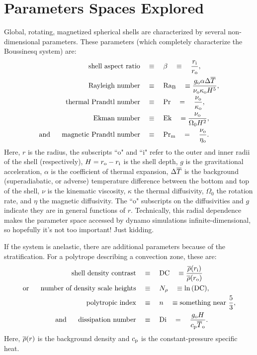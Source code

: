 \documentclass[12pt]{article} %
\begin{document}
\section{Parameters  Spaces Explored}
Global, rotating, magnetized spherical shells are characterized by several non-dimensional parameters. These parameters (which completely characterize the Boussinesq system) are:
\begin{align}
	\text{shell aspect ratio}\quad & \equiv\quad \beta \quad  \equiv\quad  \frac{r_{\rm{i}}}{r_{\rm{o}}},\\
	\text{Rayleigh number} \quad & \equiv \quad {\rm{Ra_B}} \quad \equiv \frac{g_{\rm{o}}\alpha\Delta\overline{T}}{\nu_{\rm{o}}\kappa_{\rm{o}} H^5},\\
	\text{thermal Prandtl number} \quad & \equiv \quad {\rm{Pr}} \quad = \quad \frac{\nu_{\rm{o}}}{\kappa_{\rm{o}}},\\
	\text{Ekman number}\quad & \equiv \quad {\rm{Ek}} \quad = \frac{\nu_{\rm{o}}}{\Omega_0H^2},\\
	\text{and}\ \ \ \ \ \text{magnetic Prandtl number} \quad & \equiv \quad {\rm{Pr_m}} \quad = \quad \frac{\nu_{\rm{o}}}{\eta_{\rm{o}}}.
\end{align}
Here, $r$ is the radius, the subscripts ``o" and ``i" refer to the outer and inner radii of the shell (respectively), $H=r_{\rm{o}}-r_{\rm{i}}$ is the shell depth, $g$ is the gravitational acceleration, $\alpha$ is the coefficient of thermal expansion, $\Delta\overline{T}$ is the background (superadiabatic, or adverse) temperature difference between the bottom and top of the shell, $\nu$ is the kinematic viscosity, $\kappa$ the thermal diffusivity, $\Omega_0$ the rotation rate, and $\eta$ the magnetic diffusivity. The ``o" subscripts on the diffusivities and $g$ indicate they are in general functions of $r$. Technically, this radial dependence makes the parameter space accessed by dynamo simulations infinite-dimensional, so hopefully it's not too important! Just kidding.

If the system is anelastic, there are additional parameters because of the stratification. For a polytrope describing a convection zone, these are:
\begin{align}
	\text{shell density contrast}\quad & \equiv \quad {\rm{DC}} \quad \equiv \frac{\overline{\rho}(r_{\rm{i}})}{\overline{\rho}(r_{\rm{o}})}\\
	\text{or}\ \ \ \ \  \text{number of density scale heights}\quad &  \equiv \quad N_\rho \quad \equiv \ln{(\rm{DC})}, \\ 
	\text{polytropic index} \quad & \equiv \quad n \quad \equiv \text{something near}\  \frac{5}{3},\\
	\text{and}\ \ \ \ \  \text{dissipation number} \quad & \equiv\quad {\rm{Di}}\quad = \quad \frac{g_{\rm{o}} H}{c_{\rm{p}} \overline{T}_{\rm{o}}}.
\end{align}
Here, $\overline{\rho}(r)$ is the background density and $c_{\rm{p}}$ is the constant-pressure specific heat. 
\end{document}
